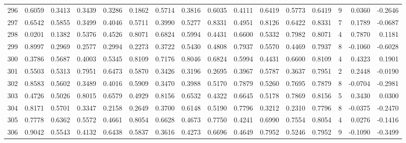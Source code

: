 \begin{tabular}{lrrrrrrrrrrrrrrr}
296 &      0.6059 &  0.3413 &  0.3439 &  0.3286 &  0.1862 &  0.5714 &  0.3816 &  0.6035 &  0.4111 &  0.6419 &   0.5773 &     0.6419 &      9 &                    0.0360 &                    -0.2646 \\
297 &      0.6542 &  0.5855 &  0.3499 &  0.4046 &  0.5711 &  0.3990 &  0.5277 &  0.8331 &  0.4951 &  0.8126 &   0.6422 &     0.8331 &      7 &                    0.1789 &                    -0.0687 \\
298 &      0.0201 &  0.1382 &  0.5376 &  0.4526 &  0.8071 &  0.6824 &  0.5994 &  0.4431 &  0.6600 &  0.5332 &   0.7982 &     0.8071 &      4 &                    0.7870 &                     0.1181 \\
299 &      0.8997 &  0.2969 &  0.2577 &  0.2994 &  0.2273 &  0.3722 &  0.5430 &  0.4808 &  0.7937 &  0.5570 &   0.4469 &     0.7937 &      8 &                   -0.1060 &                    -0.6028 \\
300 &      0.3786 &  0.5687 &  0.4003 &  0.5345 &  0.8109 &  0.7176 &  0.8046 &  0.6824 &  0.5994 &  0.4431 &   0.6600 &     0.8109 &      4 &                    0.4323 &                     0.1901 \\
301 &      0.5503 &  0.5313 &  0.7951 &  0.6473 &  0.5870 &  0.3426 &  0.3196 &  0.2695 &  0.3967 &  0.5787 &   0.3637 &     0.7951 &      2 &                    0.2448 &                    -0.0190 \\
302 &      0.8583 &  0.5602 &  0.3489 &  0.4016 &  0.5909 &  0.3470 &  0.3988 &  0.5170 &  0.7879 &  0.5260 &   0.7695 &     0.7879 &      8 &                   -0.0704 &                    -0.2981 \\
303 &      0.4726 &  0.5026 &  0.8015 &  0.6579 &  0.4929 &  0.8156 &  0.6532 &  0.4322 &  0.6645 &  0.5178 &   0.7869 &     0.8156 &      5 &                    0.3430 &                     0.0300 \\
304 &      0.8171 &  0.5701 &  0.3347 &  0.2158 &  0.2649 &  0.3700 &  0.6148 &  0.5190 &  0.7796 &  0.3212 &   0.2310 &     0.7796 &      8 &                   -0.0375 &                    -0.2470 \\
305 &      0.7778 &  0.6362 &  0.5572 &  0.4661 &  0.8054 &  0.6628 &  0.4673 &  0.7750 &  0.4241 &  0.6990 &   0.7554 &     0.8054 &      4 &                    0.0276 &                    -0.1416 \\
306 &      0.9042 &  0.5543 &  0.4132 &  0.6438 &  0.5837 &  0.3616 &  0.4273 &  0.6696 &  0.4649 &  0.7952 &   0.5246 &     0.7952 &      9 &                   -0.1090 &                    -0.3499 \\

\end{tabular}

